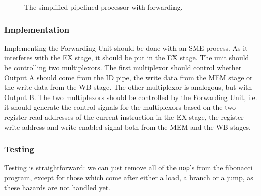 \begin{figure}
{
    }
    \caption{The simplified pipelined processor with forwarding.}
    \label{fig:forw}
\end{figure}

\subsubsection*{Implementation}
Implementing the Forwarding Unit should be done with an SME process. As it
interferes with the EX stage, it should be put in the EX stage. The unit should
be controlling two multiplexors. The first multiplexor should control whether
Output A should come from the ID pipe, the write data from the MEM stage or the
write data from the WB stage. The other multiplexor is analogous, but with
Output B. The two multiplexors should be controlled by the Forwarding Unit,
i.e. it should generate the control signals for the multiplexors based on the
two register read addresses of the current instruction in the EX stage, the
register write address and write enabled signal both from the MEM and the WB
stages.

\subsubsection*{Testing}
Testing is straightforward: we can just remove all of the \texttt{nop}'s from
the fibonacci program, except for those which come after either a load, a
branch or a jump, as these hazards are not handled yet.

